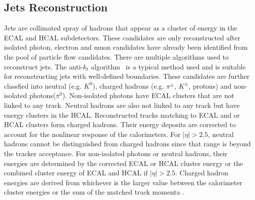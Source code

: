 \subsection{Jets Reconstruction}

Jets are collimated spray of hadrons that appear as a cluster of energy in the ECAL and HCAL subdetectors. These candidates are only reconstructed after isolated photon, electron and muon candidates have already been identified from the pool of particle flow candidates. There are multiple algorithms used to reconstruct jets. The anti-$k_{t}$ algorithm~\cite{antikt_algorithm} is a typical method used and is suitable for reconstructing jets with well-defined boundaries. These candidates are further classfied into neutral (e.g. $K^{0}$), charged hadrons (e.g. $\pi^{\pm}$, $K^{\pm}$, protons) and non-isolated photons($\pi^{0}$). Non-isolated photons have ECAL clusters that are not linked to any track. Neutral hadrons are also not linked to any track but have energy clusters in the HCAL. Reconstructed tracks matching to ECAL and or HCAL clusters form charged hadrons. Their energy deposits are corrected to account for the nonlinear response of the calorimeters. For $|\eta| > 2.5$, neutral hadrons cannot be distinguished from charged hadrons since that range is beyond the tracker acceptance.  For non-isolated photons or neutral hadrons, their energies are determined by the corrected ECAL or HCAL cluster energy or the combined cluster energy of ECAL and HCAL if $|\eta| > 2.5$. Charged hadron energies are derived from whichever is the larger value between the calorimeter cluster energies or the sum of the matched track momenta \cite{Strologas:2287326}. 





